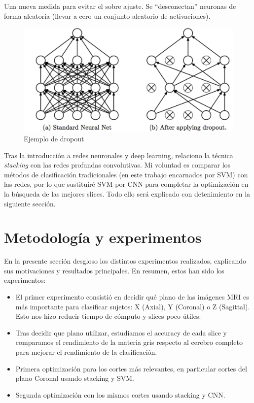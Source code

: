 \begin{itemize}
\begin{itemize}
	Una nueva medida para evitar el sobre ajuste. Se ``desconectan'' neuronas de forma aleatoria (llevar a cero un conjunto aleatorio de activaciones). 
						
		\begin{figure}[H] %
		\centering
		\includegraphics[scale=0.3]{dropout.png}  %
		\caption{Ejemplo de dropout} 
		\label{fig:drop}
	\end{figure}				
\end{itemize}

 
\end{itemize}

Tras la introducción a redes neuronales y deep learning, relaciono la técnica \textit{stacking} con las redes profundas convolutivas. Mi voluntad es comparar los métodos de clasificación tradicionales (en este trabajo encarnados por SVM) con las redes, por lo que sustituiré SVM por CNN para completar la optimización en la búsqueda de las mejores slices. Todo ello será explicado con detenimiento en la siguiente sección.

\newpage 

\section{Metodología y experimentos}

En la presente sección desgloso los distintos experimentos realizados, explicando sus motivaciones y resultados principales. En resumen, estos han sido los experimentos:

\begin{itemize}
	\item El primer experimento consistió en decidir qué plano de las imágenes MRI es más importante para clasificar sujetos: X (Axial), Y (Coronal) o Z (Sagittal). Esto nos hizo reducir tiempo de cómputo y slices poco útiles.
	\item Tras decidir que plano utilizar, estudiamos el accuracy de cada slice y comparamos el rendimiento de la materia gris respecto al cerebro completo para mejorar el rendimiento de la clasificación.
	\item Primera optimización para los cortes más relevantes, en particular cortes del plano Coronal usando stacking y SVM.
	\item Segunda optimización con los mismos cortes usando stacking y CNN.
\end{itemize}


